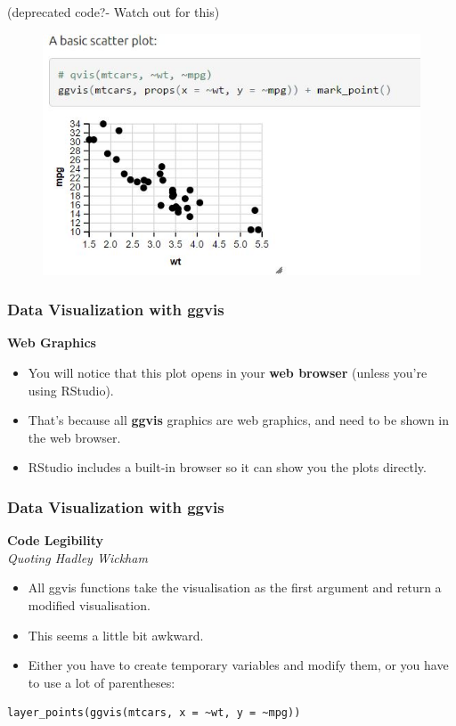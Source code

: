 \documentclass[MASTER.tex]{subfiles}
\begin{document}
\begin{frame}
(deprecated code?-  Watch out for this)
	\begin{figure}
\centering
\includegraphics[width=1.05\linewidth]{plot01}
\end{figure}

\end{frame}
\begin{frame}
	\frametitle{Data Visualization with ggvis}
	
	\Large
	\textbf{Web Graphics}
	\begin{itemize}
		\item You will notice that this plot opens in your \textbf{web browser} (unless you’re using RStudio). 
		\item That’s because all \textbf{ggvis} graphics are web graphics, and need to be shown in the web browser. \bigskip
		\item RStudio includes a built-in browser so it can show you the plots directly.
	
	\end{itemize}
	
\end{frame}
\begin{frame}[fragile]
	\frametitle{Data Visualization with ggvis}

	\Large
	\textbf{Code Legibility}\\
	\textit{Quoting Hadley Wickham}\\ 
\begin{itemize}
\item All ggvis functions take the visualisation as the first argument and return a modified visualisation.\item This seems a little bit awkward. \item Either you have to create temporary variables and modify them, or you have to use a lot of parentheses:
\end{itemize}

{
	\large
\begin{verbatim}
layer_points(ggvis(mtcars, x = ~wt, y = ~mpg))
\end{verbatim}
}
\end{frame}
\end{document}
